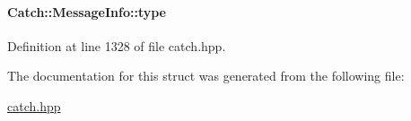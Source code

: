 \paragraph[{type}]{ Catch\+::\+Message\+Info\+::type}\label{a00050_ae928b9117465c696e45951d9d0284e78}


Definition at line 1328 of file catch.\+hpp.



The documentation for this struct was generated from the following file\+:\begin{DoxyCompactItemize}
\item 
\hyperlink{a00094}{catch.\+hpp}\end{DoxyCompactItemize}

